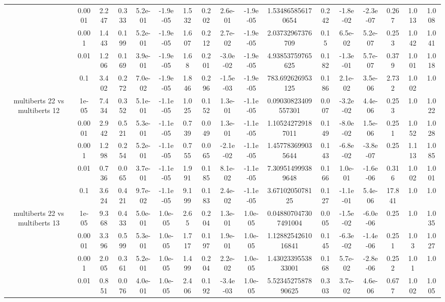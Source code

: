 \begin{tabular}{|c|c|c|c|c|c|c|c|c|c|c|c|c|c|c|c|c|}
 & 0.0001 & 2.247 & 0.333 & 5.2e-01 & -1.9e-05 & 1.532 & 0.202 & 2.6e-01 & -1.9e-05 & 1.534865856170654 & 0.242 & -1.8e-02 & -2.3e-07 & 0.267 & 1.013 & 1.008 \\
 & 0.001 & 1.443 & 0.199 & 5.2e-01 & -1.9e-05 & 1.607 & 0.212 & 2.7e-02 & -1.9e-05 & 2.03732967376709 & 0.15 & 6.5e-02 & 5.2e-07 & 0.253 & 1.042 & 1.041 \\
 & 0.01 & 1.206 & 0.169 & 3.9e-01 & -1.9e-05 & 1.68 & 0.201 & -3.0e-02 & -1.9e-05 & 4.93853759765625 & 0.182 & -1.3e-01 & 5.7e-07 & 0.379 & 1.001 & 1.018 \\
 & 0.1 & 3.402 & 0.272 & 7.0e-02 & -1.9e-05 & 1.846 & 0.296 & -1.5e-03 & -1.9e-05 & 783.692626953125 & 0.186 & 2.1e-02 & 3.5e-06 & 2.732 & 1.002 & 1.0 \\
\hline
\multirow{5}{*}{multiberts 22 vs multiberts 12} & 1e-05 & 7.434 & 0.352 & 5.1e-01 & -1.1e-05 & 1.025 & 0.152 & 1.3e-01 & -1.1e-05 & 0.09030823409557301 & 0.007 & -3.2e-02 & 4.4e-06 & 0.253 & 1.0 & 1.022 \\
 & 0.0001 & 2.942 & 0.521 & 5.3e-01 & -1.1e-05 & 0.739 & 0.049 & 1.3e-01 & -1.1e-05 & 1.105242729187011 & 0.149 & -8.0e-02 & 1.5e-06 & 0.251 & 1.052 & 1.028 \\
 & 0.001 & 1.298 & 0.254 & 5.2e-01 & -1.1e-05 & 0.755 & 0.065 & -2.1e-02 & -1.1e-05 & 1.457783699035644 & 0.143 & -6.8e-02 & -3.8e-07 & 0.25 & 1.113 & 1.085 \\
 & 0.01 & 0.736 & 0.065 & 3.7e-01 & -1.1e-05 & 1.991 & 0.185 & 8.1e-02 & -1.1e-05 & 7.309514999389648 & 0.166 & 1.0e-01 & -1.6e-06 & 0.316 & 1.002 & 1.001 \\
 & 0.1 & 3.624 & 0.421 & 9.7e-02 & -1.1e-05 & 9.199 & 0.183 & 2.4e-02 & -1.1e-05 & 3.6710205078125 & 0.127 & -1.1e-01 & 5.4e-06 & 17.841 & 1.0 & 1.0 \\
\hline
\multirow{5}{*}{multiberts 22 vs multiberts 13} & 1e-05 & 9.368 & 0.433 & 5.0e-01 & 1.0e-05 & 2.65 & 0.204 & 1.3e-01 & 1.0e-05 & 0.048807047307491004 & 0.005 & -1.5e-02 & -6.0e-06 & 0.25 & 1.0 & 1.035 \\
 & 0.0001 & 3.396 & 0.599 & 5.3e-01 & 1.0e-05 & 1.717 & 0.197 & 1.9e-01 & 1.0e-05 & 1.1288254261016841 & 0.145 & -6.3e-02 & -1.4e-06 & 0.251 & 1.03 & 1.027 \\
 & 0.001 & 2.005 & 0.361 & 5.2e-01 & 1.0e-05 & 1.499 & 0.204 & 2.2e-02 & 1.0e-05 & 1.4302339553833001 & 0.168 & 5.7e-02 & -2.8e-06 & 0.252 & 1.01 & 1.0 \\
 & 0.01 & 0.851 & 0.076 & 4.0e-01 & 1.0e-05 & 2.406 & 0.192 & -3.4e-03 & 1.0e-05 & 5.5234527587890625 & 0.303 & 3.7e-02 & 4.6e-06 & 0.677 & 1.002 & 1.005 \\

\end{tabular}
